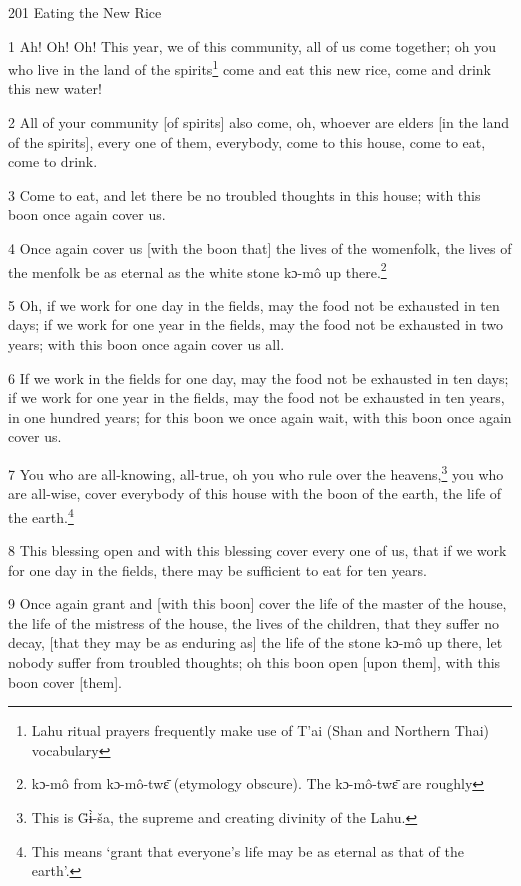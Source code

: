 
201 Eating the New Rice

1 Ah! Oh! Oh! This year, we of this community, all of us come together; oh you
who live in the land of the spirits\footnote{Lahu ritual prayers frequently make use of T'ai (Shan and Northern Thai) vocabulary} come and eat this new rice, come and drink
this new water!

2 All of your community [of spirits] also come, oh, whoever are elders [in the
land of the spirits], every one of them, everybody, come to this house, come to
eat, come to drink.

3 Come to eat, and let there be no troubled thoughts in this house; with this boon
once again cover us.

4 Once again cover us [with the boon that] the lives of the womenfolk, the lives
of the menfolk be as eternal as the white stone kɔ-mô up there.\footnote{kɔ-mô from kɔ-mô-twɛ̄ (etymology obscure). The kɔ-mô-twɛ̄ are roughly}

5 Oh, if we work for one day in the fields, may the food not be exhausted in ten
days; if we work for one year in the fields, may the food not be exhausted in two
years; with this boon once again cover us all.

6 If we work in the fields for one day, may the food not be exhausted in ten days;
if we work for one year in the fields, may the food not be exhausted in ten years,
in one hundred years; for this boon we once again wait, with this boon once again
cover us.

7 You who are all-knowing, all-true, oh you who rule over the heavens,\footnote{This is G̈ɨ̀-ša, the supreme and creating divinity of the Lahu.} you who
are all-wise, cover everybody of this house with the boon of the earth, the life
of the earth.\footnote{This means `grant that everyone's life may be as eternal as that of the earth'.}

8 This blessing open and with this blessing cover every one of us, that if we work
for one day in the fields, there may be sufficient to eat for ten years.

9 Once again grant and [with this boon] cover the life of the master of the house,
the life of the mistress of the house, the lives of the children, that they suffer
no decay, [that they may be as enduring as] the life of the stone kɔ-mô up there,
let nobody suffer from troubled thoughts; oh this boon open [upon them], with this
boon cover [them].


